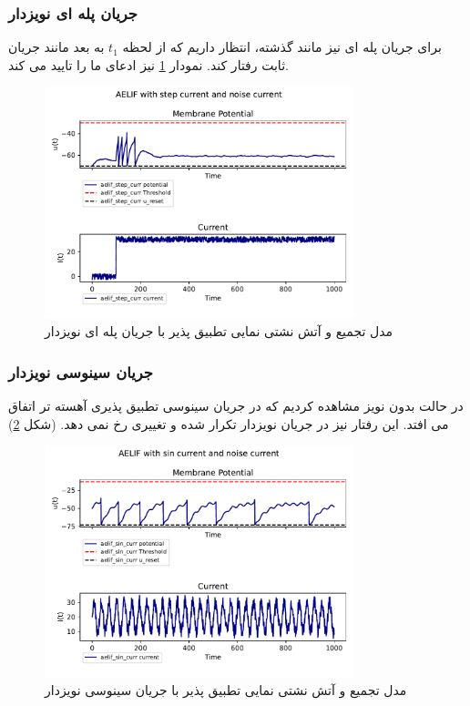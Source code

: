 \documentclass{article}
\begin{document}
            \subsubsection{جریان پله ای نویزدار}
                برای جریان پله ای نیز مانند گذشته، انتظار داریم که از لحظه 
                $t_1$ 
                به بعد مانند جریان ثابت رفتار کند. نمودار 
                \ref{fig:aelif-step-noise-curr} 
                نیز ادعای ما را تایید می کند.
                \begin{figure}[H]
                    \centering
                    \includegraphics[width=0.8\textwidth]{plots/AELIF with step current and noise current.pdf} 
                    \caption{مدل تجمیع و آتش نشتی نمایی تطبیق پذیر با جریان پله ای نویزدار  }
                    \label{fig:aelif-step-noise-curr}
                \end{figure}
            \subsubsection{جریان سینوسی نویزدار}
                در حالت بدون نویز مشاهده کردیم که در جریان سینوسی تطبیق پذیری آهسته تر اتفاق می افتد. این رفتار نیز در جریان نویزدار تکرار شده و تغییری رخ نمی دهد.
                (شکل \ref{fig:aelif-sin-noise-curr})
                \begin{figure}[H]
                    \centering
                    \includegraphics[width=0.8\textwidth]{plots/AELIF with sin current and noise current.pdf} 
                    \caption{مدل تجمیع و آتش نشتی نمایی تطبیق پذیر با جریان سینوسی نویزدار  }
                    \label{fig:aelif-sin-noise-curr}
                \end{figure}
\end{document}
